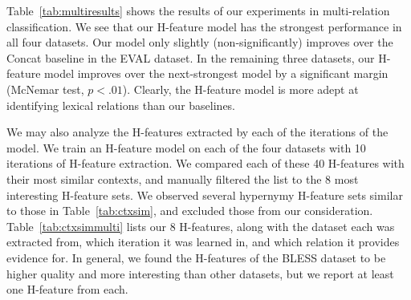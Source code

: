 Table~\ref{tab:multiresults} shows the results of our experiments in
multi-relation classification. We see that our H-feature model has the
strongest performance in all four datasets. Our model only slightly
(non-significantly) improves over the Concat baseline in the EVAL dataset.
In the remaining three datasets, our H-feature model improves over the
next-strongest model by a significant margin (McNemar test, $p < .01$).
Clearly, the H-feature model is more adept at identifying lexical relations
than our baselines.

We may also analyze the H-features extracted by each of the iterations of the
model. We train an H-feature model on each of the four datasets with 10
iterations of H-feature extraction. We compared each of these 40 H-features
with their most similar contexts, and manually filtered the list to the
8 most interesting H-feature sets. We observed several hypernymy H-feature
sets similar to those in Table~\ref{tab:ctxsim}, and excluded those from our
consideration.
Table~\ref{tab:ctxsimmulti} lists our 8 H-features, along with the dataset
each was extracted from, which iteration it was learned in, and which relation
it provides evidence for. In general, we found the H-features of the BLESS
dataset to be higher quality and more interesting than other datasets, but
we report at least one H-feature from each.

